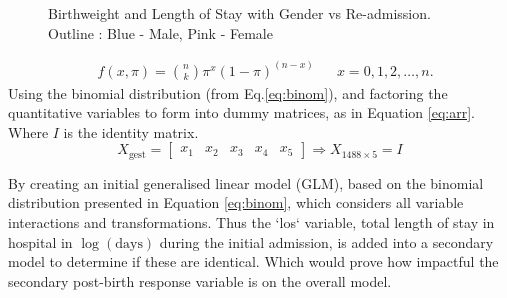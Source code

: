 \documentclass[11pt]{article}
\begin{document}
\begin{figure}[ht]%
    \centering
    \qquad
    \caption{Birthweight and Length of Stay with Gender vs Re-admission. Outline : Blue - Male, Pink - Female}%
    \label{fig:genders}%
\end{figure}

\begin{align}\label{eq:binom}
    &f(x,\pi) = \binom{n}{k} \pi^{x}(1-\pi)^{(n-x)} && x = 0,1,2,\dots,n. 
\end{align}
Using the binomial distribution (from Eq.\ref{eq:binom}), and factoring the quantitative variables to form into dummy matrices, as in Equation \ref{eq:arr}. Where $\textit{I}$ is the identity matrix.
\begin{equation}\label{eq:arr}
    X_{\text{gest}} =
        \begin{bmatrix}
            x_{1} & x_{2} & x_{3} & x_{4} & x_{5}
        \end{bmatrix} \Rightarrow X_{1488\times 5} = \textit{I}
\end{equation}

By creating an initial generalised linear model (GLM), based on the binomial distribution presented in Equation \ref{eq:binom}, which considers all variable interactions and transformations. Thus the `los` variable, total length of stay in hospital in $\log(\text{days})$ during the initial admission, is added into a secondary model to determine if these are identical. Which would prove how impactful the secondary post-birth response variable is on the overall model.
\end{document}
